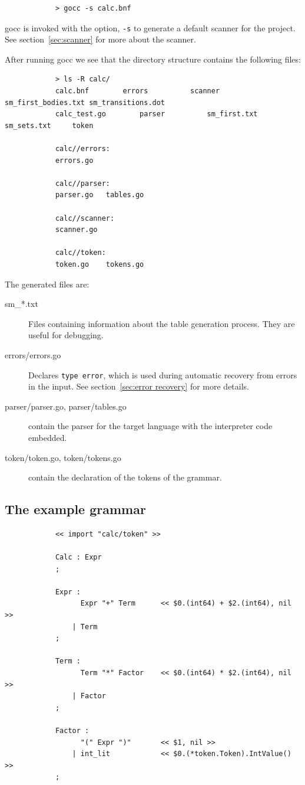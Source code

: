 \documentclass[12pt]{article}
\begin{document}
		\begin{verbatim}
			> gocc -s calc.bnf
		\end{verbatim}

		gocc is invoked with the option, \verb|-s| to generate a default scanner for the project. See section~\ref{sec:scanner} for more about the scanner.

		After running gocc we see that the directory structure contains the following files:

		\begin{verbatim}
			> ls -R calc/
			calc.bnf		errors			scanner			sm_first_bodies.txt	sm_transitions.dot
			calc_test.go		parser			sm_first.txt		sm_sets.txt		token

			calc//errors:
			errors.go

			calc//parser:
			parser.go	tables.go

			calc//scanner:
			scanner.go

			calc//token:
			token.go	tokens.go
		\end{verbatim}

		The generated files are:
		\begin{description}
			\item[sm\_*.txt] Files containing information about the table generation process. They are useful for debugging.

			\item[errors/errors.go] Declares \verb|type error|, which is used during automatic recovery from errors in the input. See section~\ref{sec:error recovery} for more details.

			\item[parser/parser.go, parser/tables.go] contain the parser for the target language with the interpreter code embedded.

			\item[token/token.go, token/tokens.go] contain the declaration of the tokens of the grammar.
		\end{description}

	\subsection{The example grammar}
		\begin{verbatim}
			<< import "calc/token" >>

			Calc : Expr              
			;

			Expr :
			      Expr "+" Term      << $0.(int64) + $2.(int64), nil >>
			    | Term			
			;

			Term :
			      Term "*" Factor    << $0.(int64) * $2.(int64), nil >>
			    | Factor			
			;

			Factor :
			      "(" Expr ")"       << $1, nil >>
			    | int_lit            << $0.(*token.Token).IntValue() >>
			;
		\end{verbatim}
\end{document}
